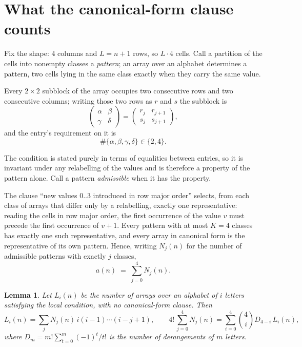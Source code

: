 \documentclass[11pt,a4paper]{article}
\theoremstyle{plain}
\newtheorem{lemma}[theorem]{Lemma}
\theoremstyle{definition}
\begin{document}
\section{What the canonical-form clause counts}

Fix the shape: $4$ columns and $L=n+1$ rows, so $L\cdot4$ cells. Call a
partition of the cells into nonempty classes a \emph{pattern}; an array over an alphabet
determines a pattern, two cells lying in the same class exactly when they carry the same
value.

Every $2\times2$ subblock of the array occupies two consecutive
rows and two consecutive columns; writing those two rows as $r$ and $s$ the
subblock is
\[
\begin{pmatrix}\alpha&\beta\\\gamma&\delta\end{pmatrix}=\begin{pmatrix}r_j&r_{j+1}\\s_j&s_{j+1}\end{pmatrix},
\]
and the entry's requirement on it is
\begin{equation}\label{eq:loc}
\#\{\alpha,\beta,\gamma,\delta\}\in\{2,4\}.
\end{equation}

The condition is stated purely in terms of equalities between entries, so it is invariant
under any relabelling of the values and is therefore a property of the pattern alone. Call a
pattern \emph{admissible} when it has the property.

The clause ``new values $0..3$ introduced in row major order'' selects, from each class
of arrays that differ only by a relabelling, exactly one representative: reading the cells in
row major order, the first occurrence of the value $v$ must precede the first occurrence of
$v+1$. Every pattern with at most $K=4$ classes has exactly one such representative, and
every array in canonical form is the representative of its own pattern. Hence, writing
$N_j(n)$ for the number of admissible patterns with exactly $j$ classes,
\begin{equation}\label{eq:apat}
a(n)\;=\;\sum_{j=0}^{4}N_j(n).
\end{equation}

\begin{lemma}\label{lem:inv}
Let $L_i(n)$ be the number of arrays over an alphabet of $i$ letters satisfying the local
condition, with no canonical-form clause. Then
\[
L_i(n)=\sum_j N_j(n)\,i(i-1)\cdots(i-j+1),
\qquad
4!\,\sum_{j=0}^{4}N_j(n)=\sum_{i=0}^{4}\binom{4}{i}D_{4-i}\,L_i(n),
\]
where $D_m=m!\sum_{t=0}^{m}(-1)^t/t!$ is the number of derangements of $m$ letters.
\end{lemma}
\end{document}
